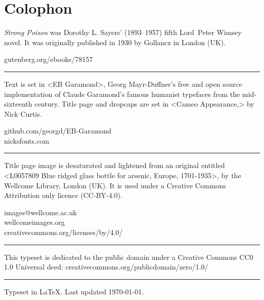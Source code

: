 \documentclass[
a5paper,
]{scrbook} %
\begin{document}
\chapter*{Colophon}
\centering
\vfill
\begin{minipage}{\textwidth}
\textit{Strong Poison} was Dorothy L. Sayers' (1893--1957) fifth Lord~Peter Wimsey novel. It was originally published in 1930 by Gollancz in London (UK).
\end{minipage}
\vfill
gutenberg.org/ebooks/78157
\vfill
\rule{0.5\textwidth}{.4pt}
\vfill
\begin{minipage}{\textwidth}
Text is set in <EB Garamond>, Georg Mayr-Duffner's free and open source implementation of Claude Garamond’s famous humanist typefaces from the mid-sixteenth century. Title page and dropcaps are set in <Cameo Appearance,> by Nick Curtis.
\end{minipage}
\vfill
github.com/georgd/EB-Garamond\\nicksfonts.com
\vfill
\rule{0.5\textwidth}{.4pt}
\vfill
\begin{minipage}{\textwidth}
Title page image is desaturated and lightened from an original entitled <L0057809 Blue ridged glass bottle for arsenic, Europe, 1701-1935>, by the Wellcome Library, London (UK). It is used under a Creative Commons Attribution only licence (CC-BY-4.0).
\end{minipage}
\vfill
images@wellcome.ac.uk\\wellcomeimages.org\\creativecommons.org/licenses/by/4.0/
\vfill
\rule{0.5\textwidth}{.4pt}
\vfill
\begin{minipage}{\textwidth}
This typeset is dedicated to the public domain under a Creative Commons CC0 1.0 Universal deed: creativecommons.org/publicdomain/zero/1.0/
\end{minipage}
\vfill
\rule{0.5\textwidth}{.4pt}
\vfill
Typeset in \LaTeX{}. Last updated \today.

\thispagestyle{empty}
\end{document}
